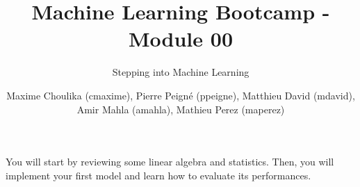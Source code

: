 \documentclass{42-en}
\begin{document}

\title{Machine Learning Bootcamp - Module 00}
\subtitle{Stepping into Machine Learning}
\author{
  Maxime Choulika (cmaxime), Pierre Peigné (ppeigne), Matthieu David (mdavid),
   Amir Mahla (amahla), Mathieu Perez (maperez)
}

\summary
{
You will start by reviewing some linear algebra and statistics.
Then, you will implement your first model and learn how to evaluate its performances.
}

\maketitle


\newpage
\tableofcontents
\startexercices



\end{document}
